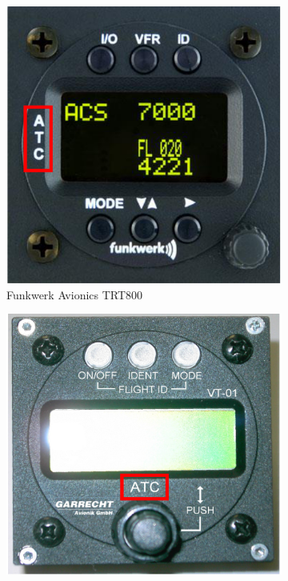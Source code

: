 \documentclass[twoside]{article}
\begin{document}
\begin{figure}
\centering
\begin{subfigure}[b]{0.24\textwidth}
	\includegraphics[width=\textwidth]{trt800}
	\caption{{Funkwerk} Avionics TRT800}
	\label{fig:trt800}
\end{subfigure}
\begin{subfigure}[b]{0.24\textwidth}
	\includegraphics[width=\textwidth]{vt01}

\end{subfigure}
\end{figure}
\end{document}
